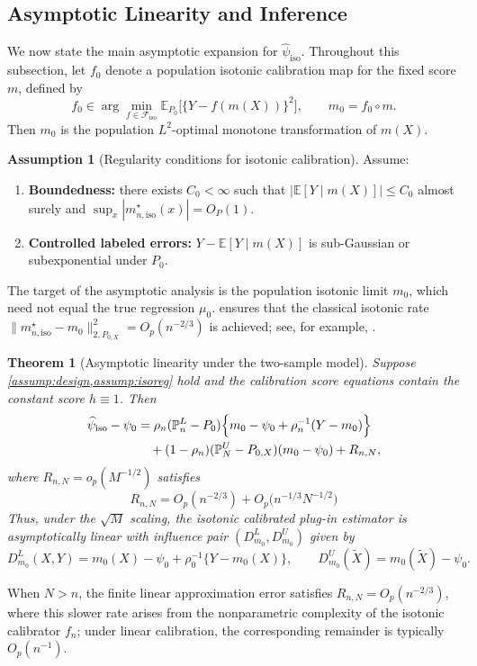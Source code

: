 \documentclass{article}
\theoremstyle{plain}
\newtheorem{theorem}{Theorem}
\theoremstyle{definition}
\newtheorem{assumption}{Assumption}
\newcommand{\E}{\mathbb{E}}
\newcommand{\1}{\mathbbm{1}}
\newcommand{\mhat}{m}
\newcommand{\rhozero}{\rho_0}
\newcommand{\rhon}{\rho_n}
\newcommand{\muzero}{\mu_0}
\newcommand{\Pl}{\mathbb{P}^{L}_n}
\newcommand{\Pu}{\mathbb{P}^{U}_N}
\newcommand{\Px}{P_{0,X}}
\begin{document}
\subsection{Asymptotic Linearity and Inference}
We now state the main asymptotic expansion for \(\widehat{\psi}_{\mathrm{iso}}\). Throughout this subsection, let \(f_0\) denote a population isotonic calibration map for the fixed score \(\mhat\), defined by
\begin{equation}
\label{eq:pop-iso}
f_0 \in \arg\min_{f\in\mathcal F_{\mathrm{iso}}}
\E_{P_0}\bigl[\{Y-f(\mhat(X))\}^2\bigr],
\qquad
m_0 = f_0 \circ \mhat.
\end{equation}
Then \(m_0\) is the population \(L^2\)-optimal monotone transformation of \(\mhat(X)\).

\begin{assumption}[Regularity conditions for isotonic calibration]
\label{assump:isoreg}
Assume:
\begin{enumerate}[leftmargin=6mm,label=(\roman*)]
\item \textbf{Boundedness:} there exists \(C_0<\infty\) such that \(|\E[Y \mid \mhat(X)]|\le C_0\) almost surely and \(\sup_x |m_{n,\mathrm{iso}}^\star(x)| = O_P(1)\).
\item \textbf{Controlled labeled errors:} \(Y-\E[Y\mid \mhat(X)]\) is sub-Gaussian or subexponential under \(P_0\).
\end{enumerate}
\end{assumption}

The target of the asymptotic analysis is the population isotonic limit \(m_0\), which need not equal the true regression \(\muzero\).  ensures that the classical isotonic rate \(\|m_{n,\mathrm{iso}}^\star-m_0\|_{2,\Px}^2=O_p(n^{-2/3})\) is achieved; see, for example, \citet{chatterjee2015risk,yang2018contraction}.

\begin{theorem}[Asymptotic linearity under the two-sample model]
\label{thm:al}
Suppose \cref{assump:design,assump:isoreg} hold and the calibration score equations contain the constant score \(h\equiv 1\). Then
\begin{align}
\label{eq:al}
\widehat{\psi}_{\mathrm{iso}}-\psi_0
&=
\rhon(\Pl-P_0)\Bigl\{m_0-\psi_0+\rhon^{-1}(Y-m_0)\Bigr\}
\nonumber\\
&\quad +
(1-\rhon)(\Pu-\Px)(m_0-\psi_0)
+R_{n,N},
\end{align}
where  $R_{n,N} = o_p(M^{-1/2})$ satisfies 
\[
R_{n,N}
=
O_p(n^{-2/3})
+
O_p\bigl(n^{-1/3}N^{-1/2}\bigr)
\]
Thus, under the \(\sqrt{M}\) scaling, the isotonic calibrated plug-in estimator is asymptotically linear with influence pair \((D_{m_0}^L,D_{m_0}^U)\) given by
\[
D_{m_0}^L(X,Y)=m_0(X)-\psi_0+\rhozero^{-1}\{Y-m_0(X)\},
\qquad
D_{m_0}^U(\widetilde X)=m_0(\widetilde X)-\psi_0.
\]
\end{theorem}
When \(N>n\), the finite linear approximation error satisfies \(R_{n,N}=O_p(n^{-2/3})\), where this slower rate arises from the nonparametric complexity of the isotonic calibrator \(f_n\); under linear calibration, the corresponding remainder is typically \(O_p(n^{-1})\). 
\end{document}

